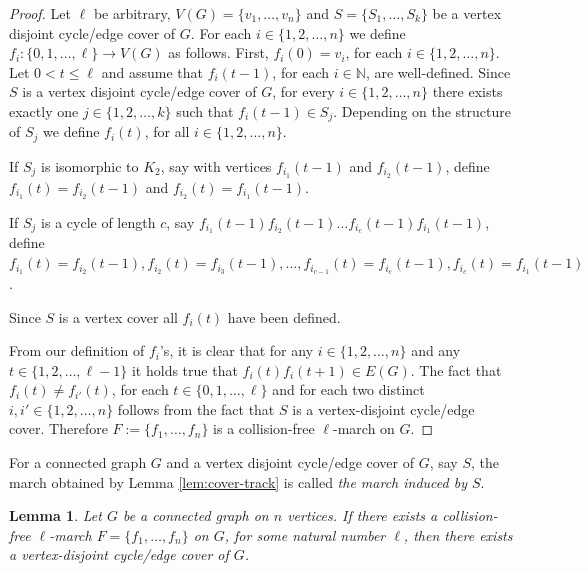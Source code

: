 \documentclass{article}
\newtheorem{lemma}[theorem]{Lemma}
\begin{document}
\begin{proof}
Let $\ell$ be arbitrary, $V(G)=\{v_1, \ldots, v_n\}$ and $S=\{S_1, \ldots, S_k\}$ be a vertex disjoint cycle/edge cover of $G$. For each $i\in \{1, 2, \ldots, n\}$ we define $f_i : \{0, 1, \ldots, \ell\}\rightarrow V(G)$ as follows. First, $f_i(0)=v_i$, for each $i\in\{1, 2, \ldots, n\}$. Let $0<t\leq \ell$ and assume that $f_i(t-1)$, for each $i\in\mathbb{N}$, are well-defined. Since $S$ is a vertex disjoint cycle/edge cover of $G$, for every $i\in\{1, 2, \ldots, n\}$ there exists exactly one $j \in \{1, 2, \ldots, k\}$ such that $f_i(t-1) \in S_j$. Depending on the structure of $S_j$ we define $f_i(t)$, for all $i\in\{1, 2, \ldots, n\}$.

If $S_j$ is isomorphic to $K_2$, say with vertices $f_{i_1}(t-1)$ and $f_{i_2}(t-1)$, define $f_{i_1}(t) = f_{i_2}(t-1)$ and $f_{i_2}(t) = f_{i_1}(t-1)$. 

If $S_j$ is a cycle of length $c$, say $f_{i_1}(t-1) f_{i_2}(t-1) \ldots f_{i_c}(t-1) f_{i_1}(t-1)$, define $f_{i_1}(t) = f_{i_2}(t-1), f_{i_2}(t) = f_{i_3}(t-1),\ldots, f_{i_{c-1}}(t) = f_{i_c}(t-1), f_{i_c}(t) = f_{i_1}(t-1)$. 

Since $S$ is a vertex cover all $f_i(t)$ have been defined. 

From our definition of $f_i$'s, it is clear that for any $i\in \{1, 2, \ldots, n\}$ and any $t\in \{1, 2, \ldots, \ell-1\}$ it holds true that $f_i(t)f_i(t+1) \in E(G)$. The fact that $f_i(t) \not= f_{i'}(t)$, for each $t \in \{0, 1, \ldots, \ell\}$ and for each two distinct $i, i' \in \{1, 2, \ldots, n\}$ follows from the fact that $S$ is a vertex-disjoint cycle/edge cover. Therefore $F:=\{f_1, \ldots, f_n\}$ is a collision-free $\ell$-march on $G$.
\end{proof}

For a connected graph $G$ and a vertex disjoint cycle/edge cover of $G$, say $S$, the march obtained by Lemma \ref{lem:cover-track} is called \emph{the march induced by $S$}.

\begin{lemma}\label{lemma:fs-give-ce-cover}
Let $G$ be a connected graph on $n$ vertices. If there exists a collision-free $\ell$-march  $F=\{f_1, \ldots, f_n\}$ on $G$, for some natural number $\ell$, then there exists a vertex-disjoint cycle/edge cover of $G$.
\end{lemma}
\end{document}
